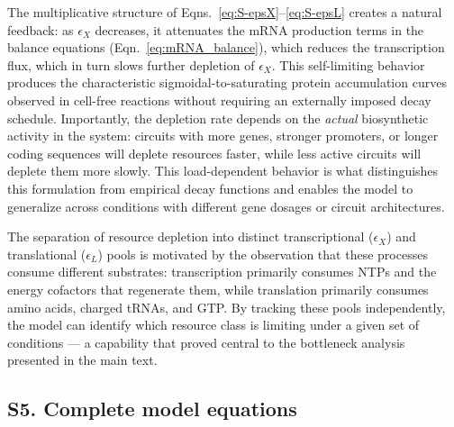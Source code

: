 The multiplicative structure of Eqns.~\ref{eq:S-epsX}--\ref{eq:S-epsL} creates a natural feedback: as $\epsilon_X$ decreases, it attenuates the mRNA production terms in the balance equations (Eqn.~\ref{eq:mRNA_balance}), which reduces the transcription flux, which in turn slows further depletion of $\epsilon_X$. This self-limiting behavior produces the characteristic sigmoidal-to-saturating protein accumulation curves observed in cell-free reactions without requiring an externally imposed decay schedule. Importantly, the depletion rate depends on the \textit{actual} biosynthetic activity in the system: circuits with more genes, stronger promoters, or longer coding sequences will deplete resources faster, while less active circuits will deplete them more slowly. This load-dependent behavior is what distinguishes this formulation from empirical decay functions and enables the model to generalize across conditions with different gene dosages or circuit architectures.

The separation of resource depletion into distinct transcriptional ($\epsilon_X$) and translational ($\epsilon_L$) pools is motivated by the observation that these processes consume different substrates: transcription primarily consumes NTPs and the energy cofactors that regenerate them, while translation primarily consumes amino acids, charged tRNAs, and GTP. By tracking these pools independently, the model can identify which resource class is limiting under a given set of conditions --- a capability that proved central to the bottleneck analysis presented in the main text.

\subsection*{S5. Complete model equations}

